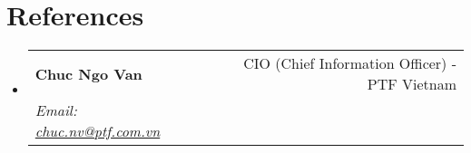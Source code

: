 \documentclass[letterpaper,11pt]{article}
\makeatletter
\newcommand{\resumeSubheading}[4]{
  \vspace{-2pt}\item
    \begin{tabular*}{0.97\textwidth}[t]{l@{\extracolsep{\fill}}r}
      \textbf{#1} & #2 \\
      \textit{\small#3} & \textit{\small #4} \\
    \end{tabular*}\vspace{-7pt}
}
\newcommand{\resumeSubHeadingListStart}{\begin{itemize}[leftmargin=0.15in, label={}]}
\newcommand{\resumeSubHeadingListEnd}{\end{itemize}}
\makeatother
\begin{document}

\section{References}
  \vspace{3pt}
  \resumeSubHeadingListStart

    \resumeSubheading
      {Chuc Ngo Van}{CIO (Chief Information Officer) - PTF Vietnam}
      {Email:\hspace{.5pt} \href{mailto:chuc.nv@ptf.com.vn}{chuc.nv@ptf.com.vn}}{}
      
  \resumeSubHeadingListEnd

  

\end{document}
